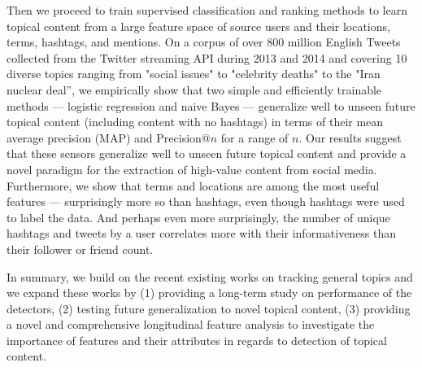 Then we proceed to train supervised classification and ranking methods
to learn topical content from a large feature space of source users
and their locations, terms, hashtags, and mentions.  On a corpus of
over 800 million English Tweets collected from the Twitter streaming
API during 2013 and 2014 and covering 10 diverse topics ranging from
"social issues" to "celebrity deaths" to the "Iran nuclear deal'', we
empirically show that two simple and efficiently trainable methods ---
logistic regression and naive Bayes --- generalize well to unseen
future topical content (including content with no hashtags) in terms
of their mean average precision (MAP) and Precision@$n$ for a range of
$n$. Our results suggest that these
sensors generalize well to unseen future topical content and provide a
novel paradigm for the extraction of high-value content from social
media.  Furthermore, we show that terms and locations are among the most
useful features --- surprisingly more so than hashtags, even though
hashtags were used to label the data.  And perhaps even more
surprisingly, the number of unique hashtags and tweets by a user
correlates more with their informativeness than their follower or
friend count.
 
In summary, we build on the recent existing works on tracking general topics and we expand these works by (1) providing a long-term study on performance of the detectors, (2) testing future generalization to novel topical content, (3) providing a novel and comprehensive longitudinal feature analysis to investigate the importance of features and their attributes in regards to detection of topical content. 


